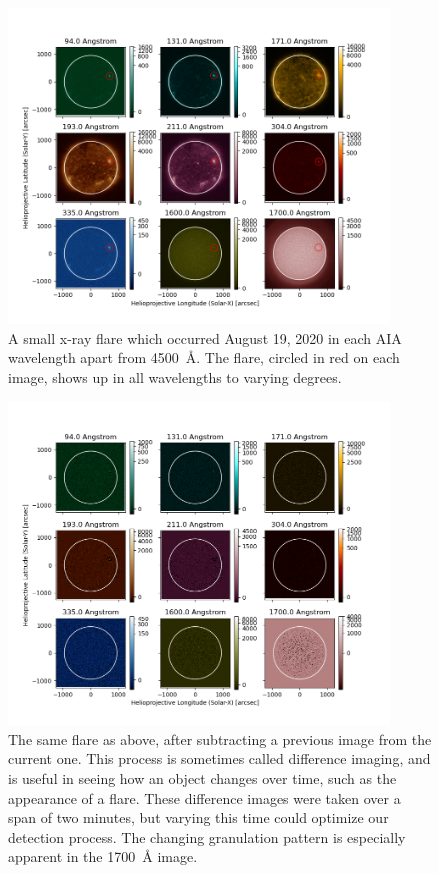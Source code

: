 \documentclass[12pt, letterpaper]{article}
\begin{document}
\begin{figure}[ht]
	\includegraphics[width=0.9\textwidth]{figures/0819_flare_labeled.png}
	\centering
	\caption{A small x-ray flare which occurred August 19, 2020 in each AIA wavelength apart from 4500~\AA{}. The flare, circled in red on each image, shows up in all wavelengths to varying degrees.}
	\label{flare}
\end{figure}

\begin{figure}[ht]
	\includegraphics[width=0.9\textwidth]{figures/0819_flare_diff.png}
	\centering
	\caption{The same flare as above, after subtracting a previous image from the current one. This process is sometimes called difference imaging, and is useful in seeing how an object changes over time, such as the appearance of a flare. These difference images were taken over a span of two minutes, but varying this time could optimize our detection process. The changing granulation pattern is especially apparent in the 1700~\AA{} image.}
	\label{flare_diff}
\end{figure}
\end{document}
